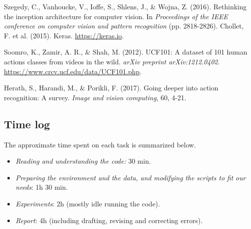 \documentclass[letterpaper, 10 pt, conference]{IEEEtran}
\begin{document}
\begin{thebibliography}{99}

 Szegedy, C., Vanhoucke, V., Ioffe, S., Shlens, J., \& Wojna, Z. (2016). Rethinking the inception architecture for computer vision. In \textit{Proceedings of the IEEE conference on computer vision and pattern recognition} (pp. 2818-2826).
 Chollet, F. et al. (2015). Keras. \url{https://keras.io}.

 Soomro, K., Zamir, A. R., \& Shah, M. (2012). UCF101: A dataset of 101 human actions classes from videos in the wild. \textit{arXiv preprint arXiv:1212.0402}. \url{https://www.crcv.ucf.edu/data/UCF101.php}.

 Herath, S., Harandi, M., \& Porikli, F. (2017). Going deeper into action recognition: A survey. \textit{Image and vision computing}, 60, 4-21.
\end{thebibliography}


\appendix

\subsection{Time log}

The approximate time spent on each task is summarized below.

\begin{itemize}
  \item \textit{Reading and understanding the code:} 30 min.
  \item \textit{Preparing the environment and the data, and modifying the scripts to fit our needs}: 1h 30 min.
  \item \textit{Experiments}: 2h (mostly idle running the code).
  \item \textit{Report}: 4h (including drafting, revising and correcting errors).
\end{itemize}
\end{document}
